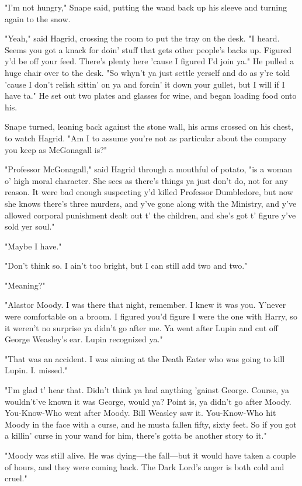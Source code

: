 "I'm not hungry," Snape said, putting the wand back up his sleeve and turning again to the snow.

"Yeah," said Hagrid, crossing the room to put the tray on the desk. "I heard. Seems you got a knack for doin' stuff that gets other people's backs up. Figured y'd be off your feed. There's plenty here 'cause I figured I'd join ya." He pulled a huge chair over to the desk. "So whyn't ya just settle yerself and do as y're told 'cause I don't relish sittin' on ya and forcin' it down your gullet, but I will if I have ta." He set out two plates and glasses for wine, and began loading food onto his.

Snape turned, leaning back against the stone wall, his arms crossed on his chest, to watch Hagrid. "Am I to assume you're not as particular about the company you keep as McGonagall is?"

"Professor McGonagall," said Hagrid through a mouthful of potato, "is a woman o' high moral character. She sees as there's things ya just don't do, not for any reason. It were bad enough suspecting y'd killed Professor Dumbledore, but now she knows there's three murders, and y've gone along with the Ministry, and y've allowed corporal punishment dealt out t' the children, and she's got t' figure y've sold yer soul."

"Maybe I have."

"Don't think so. I ain't too bright, but I can still add two and two."

"Meaning?"

"Alastor Moody. I was there that night, remember. I knew it was you. Y'never were comfortable on a broom. I figured you'd figure I were the one with Harry, so it weren't no surprise ya didn't go after me. Ya went after Lupin and cut off George Weasley's ear. Lupin recognized ya."

"That was an accident. I was aiming at the Death Eater who was going to kill Lupin. I{\el}. missed."

"I'm glad t' hear that. Didn't think ya had anything 'gainst George. Course, ya wouldn't've known it was George, would ya? Point is, ya didn't go after Moody. You-Know-Who went after Moody. Bill Weasley saw it. You-Know-Who hit Moody in the face with a curse, and he musta fallen fifty, sixty feet. So if you got a killin' curse in your wand for him, there's gotta be another story to it."

"Moody was still alive. He was dying—the fall—but it would have taken a couple of hours, and they were coming back. The Dark Lord's anger is both cold and cruel."

